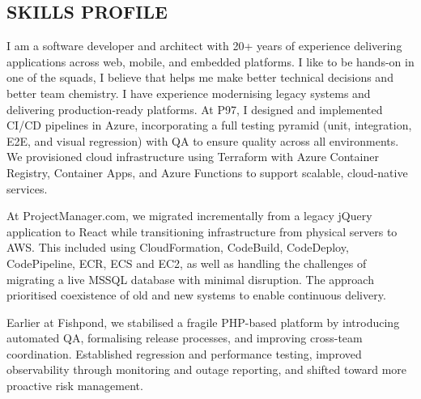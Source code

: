 \begin{resume}
\vspace{0.1in}
 
\section{SKILLS PROFILE} 
\vspace{0.1in}


I am a software developer and architect with 20+ years of experience delivering applications across web, mobile, and embedded platforms. I like to be hands-on in one of the squads, I believe that helps me make better technical decisions and better team chemistry. I have experience modernising legacy systems and delivering production-ready platforms. At P97, I designed and implemented CI/CD pipelines in Azure, incorporating a full testing pyramid (unit, integration, E2E, and visual regression) with QA to ensure quality across all environments. We provisioned cloud infrastructure using Terraform with Azure Container Registry, Container Apps, and Azure Functions to support scalable, cloud-native services.

At ProjectManager.com, we migrated incrementally from a legacy jQuery application to React while transitioning infrastructure from physical servers to AWS. This included using CloudFormation, CodeBuild, CodeDeploy, CodePipeline, ECR, ECS and EC2, as well as handling the challenges of migrating a live MSSQL database with minimal disruption. The approach prioritised coexistence of old and new systems to enable continuous delivery.

Earlier at Fishpond, we stabilised a fragile PHP-based platform by introducing automated QA, formalising release processes, and improving cross-team coordination. Established regression and performance testing, improved observability through monitoring and outage reporting, and shifted toward more proactive risk management.


\end{resume}

